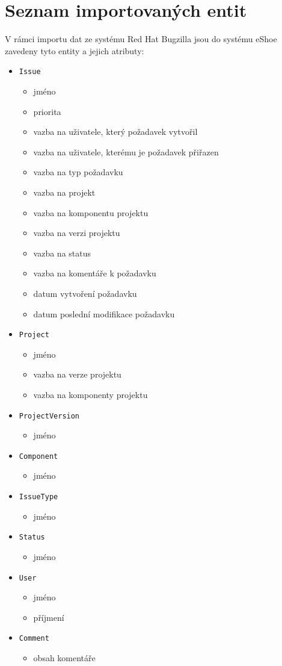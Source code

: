 \documentclass[11pt,oneside]{fithesis2}
\begin{document}
\chapter{Seznam importovaných entit}
\label{PrilohaSeznamEntit}
V rámci importu dat ze systému Red Hat Bugzilla jsou do systému eShoe zavedeny tyto entity a jejich atributy:
\begin{itemize}
	\item \texttt{Issue}
		\begin{itemize}
			\item jméno
			\item priorita
			\item vazba na uživatele, který požadavek vytvořil
			\item vazba na uživatele, kterému je požadavek přiřazen
			\item vazba na typ požadavku
			\item vazba na projekt
			\item vazba na komponentu projektu
			\item vazba na verzi projektu
			\item vazba na status
			\item vazba na komentáře k požadavku
			\item datum vytvoření požadavku
			\item datum poslední modifikace požadavku
		\end{itemize}
	\item \texttt{Project}
		\begin{itemize}
			\item jméno
			\item vazba na verze projektu
			\item vazba na komponenty projektu			
		\end{itemize}
	\item \texttt{ProjectVersion}
		\begin{itemize}
			\item jméno				
		\end{itemize}
	\item \texttt{Component}
		\begin{itemize}
			\item jméno
		\end{itemize}
	\item \texttt{IssueType}
		\begin{itemize}
			\item jméno
		\end{itemize}
	\item \texttt{Status}
		\begin{itemize}
			\item jméno
		\end{itemize}
	\item \texttt{User}
		\begin{itemize}
			\item jméno
			\item příjmení
		\end{itemize}
	\item \texttt{Comment}
		\begin{itemize}
			\item obsah komentáře
		\end{itemize}
\end{itemize}


\end{document}
